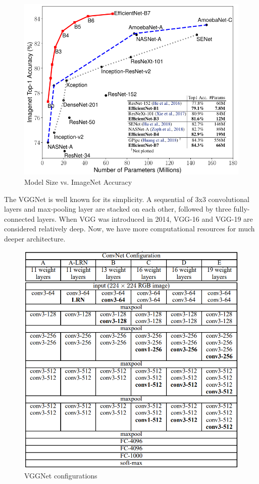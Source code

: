 \begin{figure}[H]
\centering
\includegraphics[scale=0.55]{figures/chapter_classification/efficient_net.png}
\caption{Model Size vs. ImageNet Accuracy \cite{tan2019efficientnet}}
\label{fig.efficient_net}
\end{figure}

The VGGNet is well known for its simplicity. A sequential of 3x3 convolutional layers and max-pooling layer are stacked on each other, followed by three fully-connected layers. When VGG was introduced in 2014, VGG-16 and VGG-19 are considered relatively deep. Now, we have more computational resources for much deeper architecture.

\begin{figure}[H]
\centering
\includegraphics[scale=0.5]{figures/chapter_classification/vggnet.png}
\caption{VGGNet configurations}
\label{fig.vgg_net}
\end{figure}

